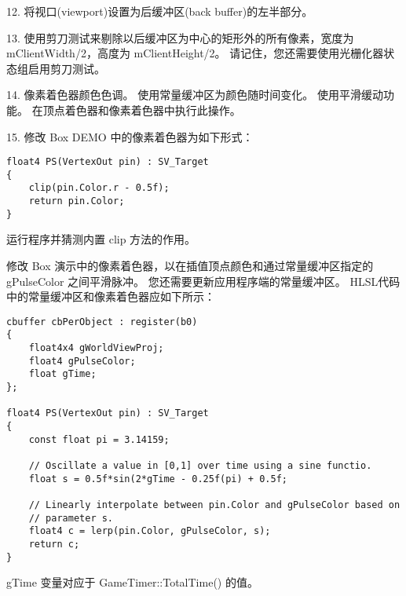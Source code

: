 \begin{flushleft}
12. 将视口(viewport)设置为后缓冲区(back buffer)的左半部分。
\end{flushleft}

\begin{flushleft}
13. 使用剪刀测试来剔除以后缓冲区为中心的矩形外的所有像素，宽度为mClientWidth/2，高度为 mClientHeight/2。 请记住，您还需要使用光栅化器状态组启用剪刀测试。
\end{flushleft}

\begin{flushleft}
14. 像素着色器颜色色调。 使用常量缓冲区为颜色随时间变化。 使用平滑缓动功能。 在顶点着色器和像素着色器中执行此操作。
\end{flushleft}

\begin{flushleft}
15. 修改 Box DEMO 中的像素着色器为如下形式：
\end{flushleft}
\begin{lstlisting}
float4 PS(VertexOut pin) : SV_Target
{
    clip(pin.Color.r - 0.5f);
    return pin.Color;
}
\end{lstlisting}
\begin{flushleft}
运行程序并猜测内置 clip 方法的作用。
\end{flushleft}

\begin{flushleft}
修改 Box 演示中的像素着色器，以在插值顶点颜色和通过常量缓冲区指定的 gPulseColor 之间平滑脉冲。 您还需要更新应用程序端的常量缓冲区。 HLSL代码中的常量缓冲区和像素着色器应如下所示：
\end{flushleft}
\begin{lstlisting}
cbuffer cbPerObject : register(b0)
{
    float4x4 gWorldViewProj;
    float4 gPulseColor;
    float gTime;
};

float4 PS(VertexOut pin) : SV_Target
{
    const float pi = 3.14159;

    // Oscillate a value in [0,1] over time using a sine functio.
    float s = 0.5f*sin(2*gTime - 0.25f(pi) + 0.5f;

    // Linearly interpolate between pin.Color and gPulseColor based on
    // parameter s.
    float4 c = lerp(pin.Color, gPulseColor, s);
    return c;
}
\end{lstlisting}
\begin{flushleft}
gTime 变量对应于 GameTimer::TotalTime() 的值。
\end{flushleft}
